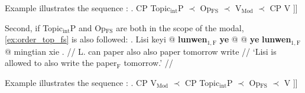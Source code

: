 \documentclass[11pt]{article}
\let\latextextsubscript\textsubscript
\let\textsubscript\latextextsubscript
\newcommand{\gap}[1]{\rule{1em}{0.4pt}\textsubscript{#1}}
\newcommand{\F}{\ensuremath{_{\mathrm{F}}}}
\newcommand{\opfs}{Op\(_{\mathrm{FS}}\)}
\newcommand{\topobj}{Topic\(_{\mathrm{int}}\)P}
\newcommand{\vmod}{V\(_{\mathrm{Mod}}\)}
\begin{document}
%
%
\begin{paracol}{2}
  
  Example \Last illustrates the sequence \Next:
  \switchcolumn
  \ex. \I{[}CP \topobj{} \(\prec\) \opfs{} \(\prec\) \vmod{} \(\prec\) \I{[}CP V  ]] \label{ex:order_matrix}

\end{paracol}

Second, if \topobj{} and \opfs{} are both in the scope of the modal, \cref{ex:order_top_fs} is also followed:
\ex.
\begingl
\gla Lisi keyi \nogloss{\{} @  \textbf{lunwen}\(_{1, \mathrm{F}}\) \textbf{ye} @ \nogloss{/} \nogloss{*} @ \textbf{ye} \textbf{lunwen}\(_{1, \mathrm{F}}\) @ \nogloss{\}} mingtian xie \nogloss{\gap{1}}. //
  \glb L. can  paper also also  paper tomorrow write //
  \glft `Lisi is allowed to also write the paper\F{} tomorrow.' //
\endgl


%   
%
%

\begin{paracol}{2}

  Example \Last illustrates the sequence \Next:
  \switchcolumn
  \ex. \I{[}CP \vmod{} \(\prec\) \I{[}CP \topobj{} \(\prec\) \opfs{} \(\prec\) V  ]] \label{ex:order_embedded}

\end{paracol}
\end{document}
